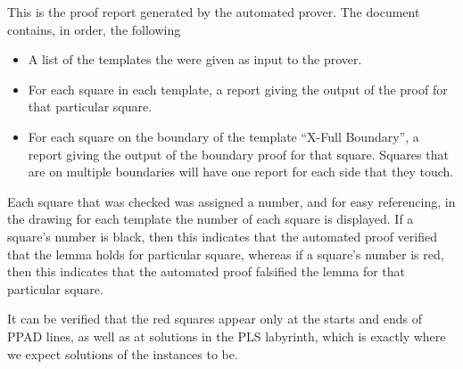 This is the proof report generated by the automated prover. 
The document contains, in order, the following
\begin{itemize}
\item A list of the templates the were given as input to the prover.
\item For each square in each template, a report giving the output of the proof
for that particular square.
\item For each square on the boundary of the template ``X-Full Boundary'', a
report giving the output of the boundary proof for that square. Squares that are
on multiple boundaries will have one report for each side that they touch.
\end{itemize}


Each square that was checked was assigned a number, and for easy referencing, in the drawing for each
template the number of each square is displayed. If a square's number is black,
then this indicates that the automated proof verified that the lemma holds for particular square,
whereas if a square's number is red, then this indicates that the automated
proof falsified the lemma for that particular square.

It can be verified that the red squares appear only at the starts and ends of
PPAD lines, as well as at solutions in the PLS labyrinth, which is exactly where 
we expect solutions of the instances to be.
